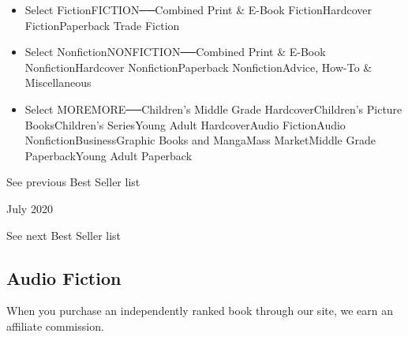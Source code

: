 \begin{itemize}
\tightlist
\item
  Select FictionFICTION──Combined Print \& E-Book FictionHardcover
  FictionPaperback Trade Fiction
\item
  Select NonfictionNONFICTION──Combined Print \& E-Book
  NonfictionHardcover NonfictionPaperback NonfictionAdvice, How-To \&
  Miscellaneous
\item
  Select MOREMORE──Children's Middle Grade HardcoverChildren's Picture
  BooksChildren's SeriesYoung Adult HardcoverAudio FictionAudio
  NonfictionBusinessGraphic Books and MangaMass MarketMiddle Grade
  PaperbackYoung Adult Paperback
\end{itemize}

\href{/books/best-sellers/2020/06/01/audio-fiction/}{}

See previous Best Seller list

July 2020

See next Best Seller list

\hypertarget{audio-fiction}{%
\subsection{Audio Fiction}\label{audio-fiction}}

When you purchase an independently ranked book through our site, we earn
an affiliate commission.

